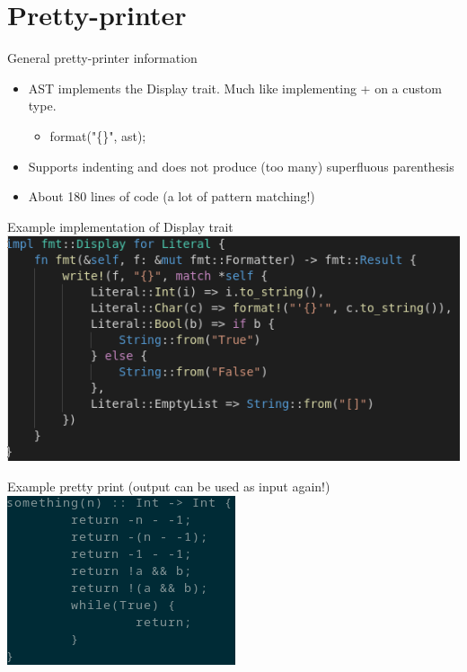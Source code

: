 \documentclass[10pt]{beamer}
\begin{document}
\section{Pretty-printer}
\begin{frame}{General pretty-printer information}
    \begin{itemize}
        \item AST implements the Display trait. Much like implementing + on a custom type.
            \begin{itemize}
                \item format("\{\}", ast);
            \end{itemize}
        \item Supports indenting and does not produce (too many) superfluous parenthesis
        \item About 180 lines of code (a lot of pattern matching!)
    \end{itemize}
\end{frame}

\begin{frame}{Example implementation of Display trait}
    \includegraphics[width=\textwidth]{literal.png}
\end{frame}

\begin{frame}{Example pretty print (output can be used as input again!)}
    \includegraphics[width=\textwidth]{pretty_printed.png}
\end{frame}
\end{document}
